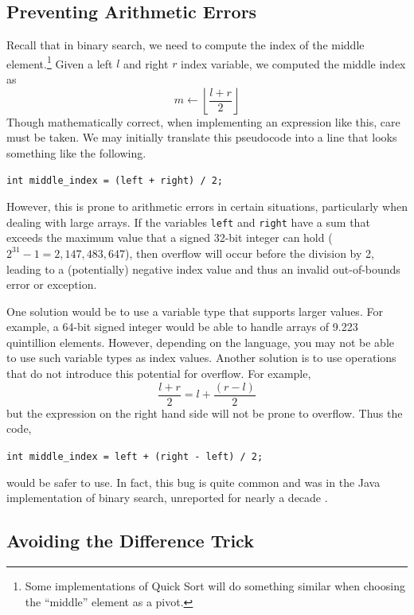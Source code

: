 

\subsection{Preventing Arithmetic Errors}

Recall that in binary search, we need to compute the index of the middle 
element.\footnote{Some implementations of Quick Sort will do something 
similar when choosing the ``middle'' element as a pivot.}  Given a left 
$l$ and right $r$ index variable, we computed the middle index as
  $$m \leftarrow \left\lfloor \frac{l + r}{2} \right\rfloor$$
Though mathematically correct, when implementing an expression like this, 
care must be taken.  We may initially translate this pseudocode into a line
that looks something like the following.
  
\texttt{int middle_index = (left + right) / 2;}

However, this is prone to arithmetic errors in certain situations, particularly
when dealing with large arrays.  If the variables \texttt{left} 
and \texttt{right} have a sum that exceeds the maximum value that 
a signed 32-bit integer can hold ($2^{31} - 1 = 2,147,483,647$), then 
overflow will occur before the division by 2, leading to a (potentially) 
negative index value and thus an invalid out-of-bounds error or exception.

One solution would be to use a variable type that supports larger
values.  For example, a 64-bit signed integer would be able to handle
arrays of 9.223 quintillion elements.  However, depending on the language, 
you may not be able to use such variable types as index values.
Another solution is to use operations that do not introduce this 
potential for overflow.  For example, 
  $$\frac{l + r}{2} = l + \frac{(r - l)}{2}$$
but the expression on the right hand side will not be prone to overflow.  
Thus the code,

\texttt{int middle_index = left + (right - left) / 2;}

would be safer to use.  In fact, this bug is quite common 
\cite{Pattis:1988:TEB:52964.53012} and was in the Java implementation
of binary search, unreported for nearly a decade \cite{Bloch2006}.

\subsection{Avoiding the Difference Trick}


